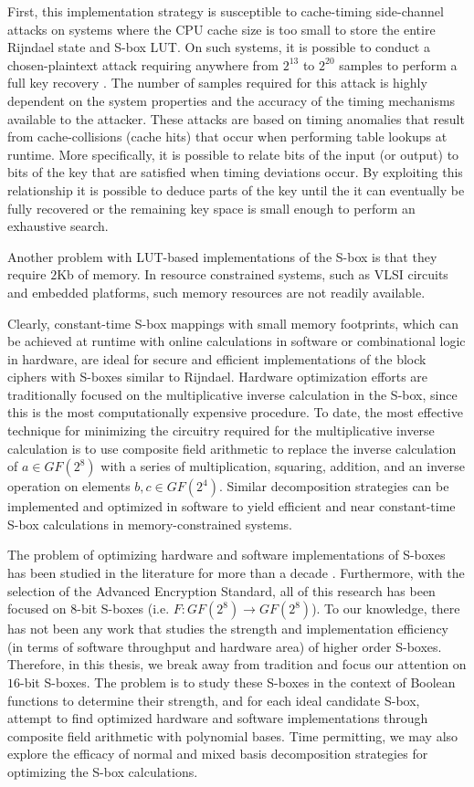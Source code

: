 First, this implementation strategy is susceptible to cache-timing 
side-channel attacks on systems where the CPU cache size is too small to store the 
entire Rijndael state and S-box LUT. On such systems, it is possible to conduct 
a chosen-plaintext attack requiring anywhere from 
$2^{13}$ to $2^{20}$ samples to perform a full key recovery \cite{Bonneau06-1}. The number of
samples required for this attack is highly dependent on the system properties
and the accuracy of the timing mechanisms available to the attacker. These attacks
are based on timing anomalies that result from cache-collisions (cache hits) 
that occur when performing table lookups at runtime. More specifically, it is possible
to relate bits of the input (or output) to bits of the key that are satisfied
when timing deviations occur. By exploiting this relationship it is possible
to deduce parts of the key until the it can eventually be fully recovered 
or the remaining key space is small enough to perform an exhaustive search. 

Another problem with LUT-based implementations of the S-box is that they require
$2$Kb of memory. In resource constrained systems, 
such as VLSI circuits and embedded platforms, such memory resources
are not readily available. 

Clearly, constant-time S-box mappings with small memory footprints, which
can be achieved at runtime with online calculations in software or combinational logic 
in hardware, are ideal for secure and efficient implementations
of the block ciphers with S-boxes similar to Rijndael. 
Hardware optimization efforts are traditionally focused on
the multiplicative inverse calculation in the S-box, since this is the 
most computationally expensive procedure. 
To date, the most effective technique for minimizing the circuitry required
for the multiplicative inverse calculation is to use composite field
arithmetic to replace the inverse calculation of $a \in GF(2^8)$ with
a series of multiplication, squaring, addition, and an inverse operation
on elements $b,c \in GF(2^4)$. Similar decomposition strategies
can be implemented and optimized in software to yield efficient and 
near constant-time S-box calculations in memory-constrained systems.

The problem of optimizing hardware and software implementations of S-boxes has been 
studied in the literature for more than a decade \cite{Satoh01-1, Mentens05-1, Canright05-1, Boyar12-1}.
Furthermore, with the selection of the Advanced Encryption Standard,
all of this research has been focused on 8-bit S-boxes (i.e. $F : GF(2^8) \to GF(2^8)$).
To our knowledge, there has not been any work that studies the strength and
implementation efficiency (in terms of software throughput and hardware area) of higher order
S-boxes. Therefore, in this thesis, we break away from tradition and focus our 
attention on $16$-bit S-boxes. The problem is to study these S-boxes
in the context of Boolean functions to determine their strength, and for each ideal candidate
S-box, attempt to find optimized hardware and software implementations through 
composite field arithmetic with polynomial bases. Time permitting, we may also explore the 
efficacy of normal and mixed basis decomposition strategies for optimizing the S-box calculations.

